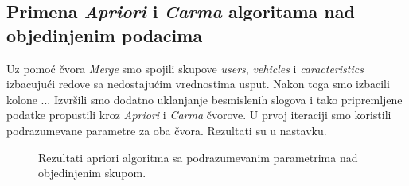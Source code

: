 \documentclass[a4paper,10pt]{article}
\begin{document}
\subsection{Primena \textit{Apriori} i \textit{Carma} algoritama nad objedinjenim podacima}

Uz pomoć čvora \textit{Merge} smo spojili skupove \textit{users}, \textit{vehicles} i \textit{caracteristics} izbacujući 
redove sa nedostajućim vrednostima usput. Nakon toga smo izbacili kolone ... Izvršili smo dodatno uklanjanje besmislenih slogova
i tako pripremljene podatke propustili kroz \textit{Apriori} i \textit{Carma} čvorove. U prvoj iteraciji smo koristili
podrazumevane parametre za oba čvora. Rezultati su u nastavku.

\begin{figure}[h!]
 \centering
 \caption{Rezultati apriori algoritma sa podrazumevanim parametrima nad objedinjenim skupom.}
\end{figure}
\end{document}
